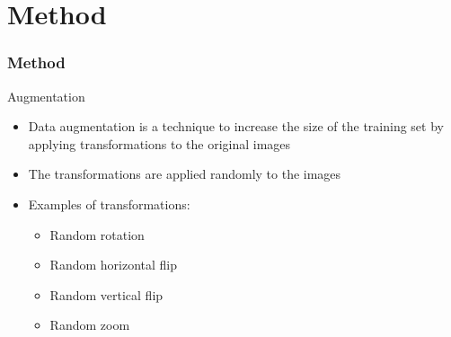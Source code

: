 \documentclass[../main.tex]{subfiles}
\begin{document}
\section{Method}
\begin{frame}[t]
    \frametitle{Method}

    \begin{block}{Augmentation}
        \begin{itemize}
            \item Data augmentation is a technique to increase the size of 
            the training set by applying transformations to the original images
            \item The transformations are applied randomly to the images
            \item Examples of transformations:
            \begin{itemize}
                \item Random rotation
                \item Random horizontal flip
                \item Random vertical flip
                \item Random zoom
            \end{itemize}
        \end{itemize}
    \end{block}
\end{frame}
\end{document}
